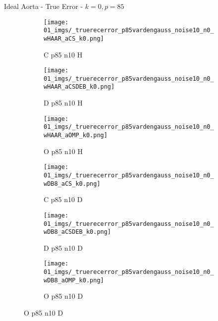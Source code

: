 \begin{frame}{Ideal Aorta - True Error - $k=0,p=85$}{}
\begin{figure}
\begin{subfigure}{0.13\textwidth}
\texttt{[image: 01\_imgs/\_truerecerror\_p85vardengauss\_noise10\_n0\_wHAAR\_aCS\_k0.png]}
\caption*{\tiny C p85 n10 H}
\end{subfigure}
\begin{subfigure}{0.13\textwidth}
\texttt{[image: 01\_imgs/\_truerecerror\_p85vardengauss\_noise10\_n0\_wHAAR\_aCSDEB\_k0.png]}
\caption*{\tiny D p85 n10 H}
\end{subfigure}
\begin{subfigure}{0.13\textwidth}
\texttt{[image: 01\_imgs/\_truerecerror\_p85vardengauss\_noise10\_n0\_wHAAR\_aOMP\_k0.png]}
\caption*{\tiny O p85 n10 H}
\end{subfigure}
\begin{subfigure}{0.13\textwidth}
\texttt{[image: 01\_imgs/\_truerecerror\_p85vardengauss\_noise10\_n0\_wDB8\_aCS\_k0.png]}
\caption*{\tiny C p85 n10 D}
\end{subfigure}
\begin{subfigure}{0.13\textwidth}
\texttt{[image: 01\_imgs/\_truerecerror\_p85vardengauss\_noise10\_n0\_wDB8\_aCSDEB\_k0.png]}
\caption*{\tiny D p85 n10 D}
\end{subfigure}
\begin{subfigure}{0.13\textwidth}
\texttt{[image: 01\_imgs/\_truerecerror\_p85vardengauss\_noise10\_n0\_wDB8\_aOMP\_k0.png]}
\caption*{\tiny O p85 n10 D}
\end{subfigure}

\vspace{5pt}


\end{figure}
\end{frame}
